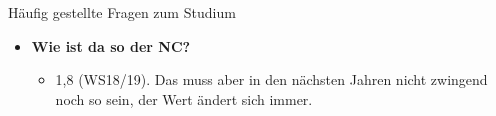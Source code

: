 \begin{block}{Häufig gestellte Fragen zum Studium}
\begin{large}
\begin{itemize}
	\item \textbf{Wie ist da so der NC?}
	\begin{itemize}
		\item 1,8 (WS18/19). Das muss aber in den nächsten Jahren nicht zwingend noch so sein, der Wert ändert sich immer.
	\end{itemize}
\end{itemize}


\end{large}
\end{block}